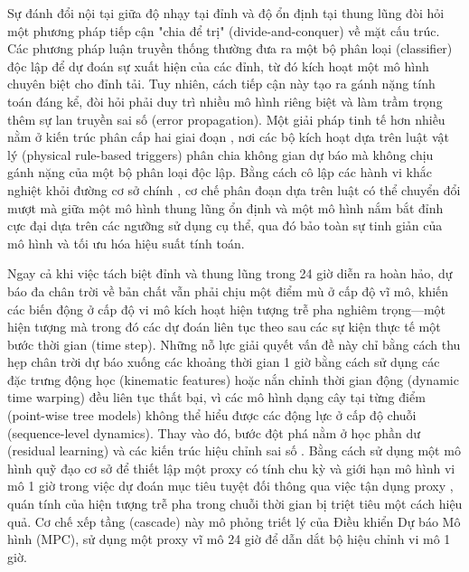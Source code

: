 \documentclass[pdflatex,sn-mathphys-num]{sn-jnl}%
\theoremstyle{thmstyleone}%
\theoremstyle{thmstyletwo}%
\theoremstyle{thmstylethree}%
\begin{document}
Sự đánh đổi nội tại giữa độ nhạy tại đỉnh và độ ổn định tại thung lũng đòi hỏi một phương pháp tiếp cận "chia để trị" (divide-and-conquer) về mặt cấu trúc. Các phương pháp luận truyền thống thường đưa ra một bộ phân loại (classifier) độc lập để dự đoán sự xuất hiện của các đỉnh, từ đó kích hoạt một mô hình chuyên biệt cho đỉnh tải. Tuy nhiên, cách tiếp cận này tạo ra gánh nặng tính toán đáng kể, đòi hỏi phải duy trì nhiều mô hình riêng biệt và làm trầm trọng thêm sự lan truyền sai số (error propagation). Một giải pháp tinh tế hơn nhiều nằm ở kiến trúc phân cấp hai giai đoạn \cite{laouafi2016daily, hsu2018two}, nơi các bộ kích hoạt dựa trên luật vật lý (physical rule-based triggers) phân chia không gian dự báo mà không chịu gánh nặng của một bộ phân loại độc lập. Bằng cách cô lập các hành vi khắc nghiệt khỏi đường cơ sở chính \cite{chen2019short, rubasinghe2023highly, papadakis1998novel}, cơ chế phân đoạn dựa trên luật có thể chuyển đổi mượt mà giữa một mô hình thung lũng ổn định và một mô hình nắm bắt đỉnh cực đại dựa trên các ngưỡng sử dụng cụ thể, qua đó bảo toàn sự tinh giản của mô hình và tối ưu hóa hiệu suất tính toán.

Ngay cả khi việc tách biệt đỉnh và thung lũng trong 24 giờ diễn ra hoàn hảo, dự báo đa chân trời về bản chất vẫn phải chịu một điểm mù ở cấp độ vĩ mô, khiến các biến động ở cấp độ vi mô kích hoạt hiện tượng trễ pha nghiêm trọng---một hiện tượng mà trong đó các dự đoán liên tục theo sau các sự kiện thực tế một bước thời gian (time step). Những nỗ lực giải quyết vấn đề này chỉ bằng cách thu hẹp chân trời dự báo xuống các khoảng thời gian 1 giờ bằng cách sử dụng các đặc trưng động học (kinematic features) hoặc nắn chỉnh thời gian động (dynamic time warping) đều liên tục thất bại, vì các mô hình dạng cây tại từng điểm (point-wise tree models) không thể hiểu được các động lực ở cấp độ chuỗi (sequence-level dynamics). Thay vào đó, bước đột phá nằm ở học phần dư (residual learning) và các kiến trúc hiệu chỉnh sai số \cite{kong2020short, shen2020novel}. Bằng cách sử dụng một mô hình quỹ đạo cơ sở để thiết lập một proxy có tính chu kỳ và giới hạn mô hình vi mô 1 giờ trong việc dự đoán mục tiêu tuyệt đối thông qua việc tận dụng proxy \cite{zhang2021novel}, quán tính của hiện tượng trễ pha trong chuỗi thời gian bị triệt tiêu một cách hiệu quả. Cơ chế xếp tầng (cascade) này mô phỏng triết lý của Điều khiển Dự báo Mô hình (MPC), sử dụng một proxy vĩ mô 24 giờ để dẫn dắt bộ hiệu chỉnh vi mô 1 giờ.
\end{document}
